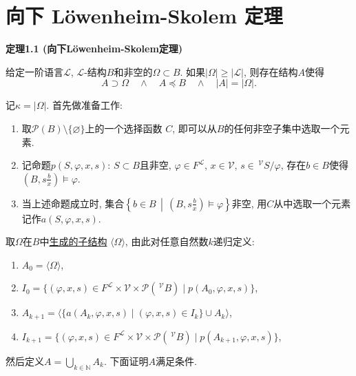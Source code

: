 \documentclass[UTF8]{ctexart}
\begin{document}
\setlength{\abovedisplayskip}{1pt}
\setlength{\belowdisplayskip}{1pt}

\section{向下 Löwenheim-Skolem 定理}

\hypertarget{sec:定理1.1}{}
\noindent\textbf{定理1.1 (向下Löwenheim-Skolem定理)}

给定一阶语言$\mathcal{L}$, $\mathcal{L}$-结构$B$和非空的$\Omega\subset B$.
如果$|\Omega|\geqslant|\mathcal{L}|$, 则存在结构$A$使得
\[
    A\supset\Omega\quad\land\quad A\preccurlyeq B\quad\land\quad|A|=|\Omega|.
\]


记$\kappa=|\Omega|$. 首先做准备工作:
\begin{enumerate}
    \item 取$\mathcal{P}(B)\setminus\{\varnothing\}$上的一个选择函数
    $C$, 即可以从$B$的任何非空子集中选取一个元素.
    \item 记命题$p(S,\varphi,x,s)$: $S\subset B$且非空, $\varphi\in F^{\mathcal{L}}$,
    $x\in\mathcal{V}$, $s\in\,\!^{\mathcal{V}}\!S/\varphi$, 存在$b\in B$使得
    $\displaystyle\left(B,s\frac{b}{x}\right)\models\varphi$.
    \item 当上述命题成立时, 集合$\displaystyle\left\{b\in B\,\middle\vert\,
    \left(B,s\frac{b}{x}\right)\models\varphi\right\}$非空, 用$C$从中选取一个元素
    记作$a(S,\varphi,x,s)$.
\end{enumerate}

\vspace{6pt}
取$\Omega$在$B$中\href{../01 一阶语言的结构/04 生成子结构#nameddest=sec:定义1.1}
{生成的子结构} $\langle\Omega\rangle$, 由此对任意自然数$k$递归定义:

\begin{enumerate}
    \item $A_0=\langle\Omega\rangle$,
    \vspace{3pt}
    \item $\displaystyle I_0=\{(\varphi,x,s)\in F^{\mathcal{L}}\times
    \mathcal{V}\times\mathcal{P}(\,^{\mathcal{V}}\!B)\mid p(A_0,\varphi,x,s)\}$,
    \item $A_{k+1}=\langle\{a(A_k,\varphi,x,s)\mid
    (\varphi,x,s)\in I_k\}\cup A_k\rangle$,
    \item $\displaystyle I_{k+1}=
    \{(\varphi,x,s)\in F^{\mathcal{L}}\times
    \mathcal{V}\times\mathcal{P}(\,^{\mathcal{V}}\!B)\mid p(A_{k+1},\varphi,x,s)\}$,
\end{enumerate}
然后定义$\displaystyle A=\bigcup_{k\in\mathbb{N}}A_k$. 下面证明$A$满足条件.
\end{document}
